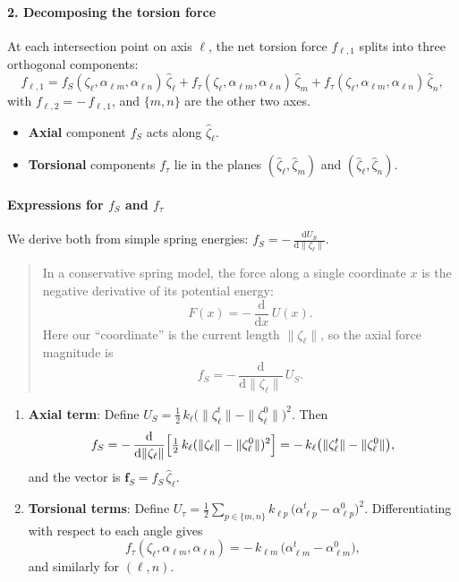\documentclass{article}
\begin{document}
\paragraph{2. Decomposing the torsion force}
At each intersection point on axis $\ell$, the net torsion force $f_{\ell,1}$ splits into three orthogonal components:
\begin{equation}
f_{\ell,1} = f_S(\zeta_\ell,\alpha_{\ell m},\alpha_{\ell n})\,\hat\zeta_\ell + f_\tau(\zeta_\ell,\alpha_{\ell m},\alpha_{\ell n})\,\hat\zeta_m + f_\tau(\zeta_\ell,\alpha_{\ell m},\alpha_{\ell n})\,\hat\zeta_n,
\tag{2.33}
\label{eq:torsion_decomp}
\end{equation}
with $f_{\ell,2} = -\,f_{\ell,1}$, and $\{m,n\}$ are the other two axes.
\begin{itemize}
    \item \textbf{Axial} component $f_S$ acts along $\hat\zeta_\ell$.
    \item \textbf{Torsional} components $f_\tau$ lie in the planes $(\hat\zeta_\ell,\hat\zeta_m)$ and $(\hat\zeta_\ell,\hat\zeta_n)$.
\end{itemize}

\paragraph{Expressions for $f_S$ and $f_\tau$}
We derive both from simple spring energies: $f_S = -\,\frac{\mathrm dU_S}{\mathrm d\|\zeta_\ell\|}$.
\begin{quote}
In a conservative spring model, the force along a single coordinate $x$ is the negative derivative of its potential energy:
$$ F(x) = -\,\frac{\mathrm d}{\mathrm d x}\,U(x). $$
Here our “coordinate” is the current length $\|\zeta_\ell\|$, so the axial force magnitude is
$$ f_S = -\,\frac{\mathrm d}{\mathrm d \|\zeta_\ell\|}\,U_S. $$
\end{quote}
\begin{enumerate}
    \item \textbf{Axial term}: Define $U_S = \tfrac12\,k_\ell\bigl(\|\zeta_\ell^t\| - \|\zeta_\ell^0\|\bigr)^2$. Then
    $$
    f_S = -\,\frac{\mathrm d}{\mathrm d \|\zeta_\ell\|} \Bigl[\tfrac12\,k_\ell(\|\zeta_\ell\|-\|\zeta_\ell^0\|)^2\Bigr] = -\,k_\ell\bigl(\|\zeta_\ell^t\|-\|\zeta_\ell^0\|\bigr),
    $$
    and the vector is $\mathbf f_S = f_S\,\hat\zeta_\ell$.

    \item \textbf{Torsional terms}: Define $U_\tau = \tfrac12\sum_{p\in\{m,n\}} k_{\ell p}\,\bigl(\alpha^t_{\ell p}-\alpha^0_{\ell p}\bigr)^2$. Differentiating with respect to each angle gives
    $$
    f_\tau(\zeta_\ell,\alpha_{\ell m},\alpha_{\ell n}) = -\,k_{\ell m}\,\bigl(\alpha^t_{\ell m}-\alpha^0_{\ell m}\bigr),
    $$
    and similarly for $(\ell,n)$.
\end{enumerate}
\end{document}
